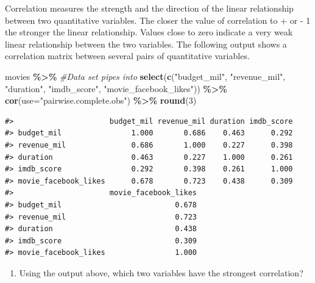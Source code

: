 \documentclass[
]{report}
\newenvironment{Shaded}{\begin{snugshade}}{\end{snugshade}}
\newcommand{\CommentTok}[1]{\textcolor[rgb]{0.56,0.35,0.01}{\textit{#1}}}
\newcommand{\DataTypeTok}[1]{\textcolor[rgb]{0.13,0.29,0.53}{#1}}
\newcommand{\DecValTok}[1]{\textcolor[rgb]{0.00,0.00,0.81}{#1}}
\newcommand{\KeywordTok}[1]{\textcolor[rgb]{0.13,0.29,0.53}{\textbf{#1}}}
\newcommand{\NormalTok}[1]{#1}
\newcommand{\OperatorTok}[1]{\textcolor[rgb]{0.81,0.36,0.00}{\textbf{#1}}}
\newcommand{\StringTok}[1]{\textcolor[rgb]{0.31,0.60,0.02}{#1}}
\providecommand{\tightlist}{%
  \setlength{\itemsep}{0pt}\setlength{\parskip}{0pt}}
\begin{document}
Correlation measures the strength and the direction of the linear relationship between two quantitative variables. The closer the value of correlation to + or - 1 the stronger the linear relationship. Values close to zero indicate a very weak linear relationship between the two variables. The following output shows a correlation matrix between several pairs of quantitative variables.

\newpage

\begin{Shaded}
\begin{Highlighting}[]
\NormalTok{movies }\OperatorTok{\%\textgreater{}\%}\StringTok{  }\CommentTok{\#Data set pipes into}
\StringTok{  }\KeywordTok{select}\NormalTok{(}\KeywordTok{c}\NormalTok{(}\StringTok{"budget\_mil"}\NormalTok{, }\StringTok{"revenue\_mil"}\NormalTok{, }
           \StringTok{"duration"}\NormalTok{, }\StringTok{"imdb\_score"}\NormalTok{, }
           \StringTok{"movie\_facebook\_likes"}\NormalTok{)) }\OperatorTok{\%\textgreater{}\%}
\StringTok{  }\KeywordTok{cor}\NormalTok{(}\DataTypeTok{use=}\StringTok{"pairwise.complete.obs"}\NormalTok{) }\OperatorTok{\%\textgreater{}\%}
\StringTok{  }\KeywordTok{round}\NormalTok{(}\DecValTok{3}\NormalTok{)}
\end{Highlighting}
\end{Shaded}

\begin{verbatim}
#>                      budget_mil revenue_mil duration imdb_score
#> budget_mil                1.000       0.686    0.463      0.292
#> revenue_mil               0.686       1.000    0.227      0.398
#> duration                  0.463       0.227    1.000      0.261
#> imdb_score                0.292       0.398    0.261      1.000
#> movie_facebook_likes      0.678       0.723    0.438      0.309
#>                      movie_facebook_likes
#> budget_mil                          0.678
#> revenue_mil                         0.723
#> duration                            0.438
#> imdb_score                          0.309
#> movie_facebook_likes                1.000
\end{verbatim}

\begin{enumerate}
\def\labelenumi{\arabic{enumi}.}
\setcounter{enumi}{5}
\tightlist
\item
  Using the output above, which two variables have the strongest correlation?
\end{enumerate}

\vspace{0.3in}
\end{document}
